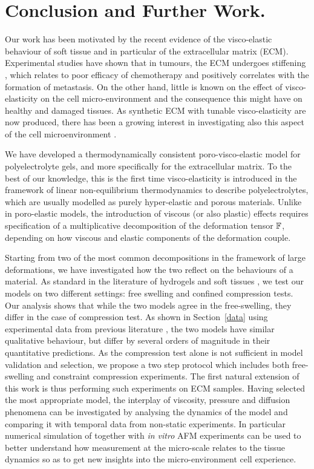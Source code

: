 \section{Conclusion and Further Work.}

Our work has been motivated by the recent evidence of the visco-elastic behaviour of soft tissue and in particular of the extracellular matrix (ECM). Experimental studies have shown that in tumours, the ECM undergoes stiffening \cite{ecm2}, which relates to poor efficacy of chemotherapy and positively correlates with the formation of metastasis. On the other hand, little is known on the effect of visco-elasticity on the cell micro-environment and the consequence this might have on healthy and damaged tissues. As synthetic ECM with tunable visco-elasticity are now produced, there has been a growing interest in investigating also this aspect of the cell microenvironment \cite{viscocell}.

We have developed a thermodynamically consistent poro-visco-elastic model for polyelectrolyte gels, and more specifically for the extracellular matrix. To the best of our knowledge, this is the first time visco-elasticity is introduced in the framework of linear non-equilibrium thermodynamics to describe polyelectrolytes, which are usually modelled as purely hyper-elastic and porous materials. Unlike in poro-elastic models, the introduction of viscous (or also plastic) effects requires specification of a multiplicative decomposition of the deformation tensor $\mathbb{F}$, depending on how viscous and elastic components of the deformation couple. 

Starting from two of the most common decompositions in the framework of large deformations, we have investigated how the two reflect on the behaviours of a material. As standard in the literature of hydrogels and soft tissues \cite{Article1,DROZDOVph,ecm2}, we test our models on two different settings: free swelling and confined compression tests. Our analysis shows that while the two models agree in the free-swelling, they differ in the case of compression test. As shown in Section~\ref{data} using experimental data from previous literature \cite{Netti}, the two models have similar qualitative behaviour, but differ by several orders of magnitude in their quantitative predictions. As the compression test alone is not sufficient in model validation and selection, we propose a two step protocol which includes both free-swelling and constraint compression experiments. The first natural extension of this work is thus performing such experiments on ECM samples. Having selected the most appropriate model, the interplay of viscosity, pressure and diffusion phenomena can be investigated by analysing the dynamics of the model and comparing it with temporal data from non-static experiments. In particular numerical simulation of  together with \textit{in vitro} AFM experiments can be used to better understand how measurement at the micro-scale relates to the tissue dynamics so as to get new insights into the micro-environment cell experience. 